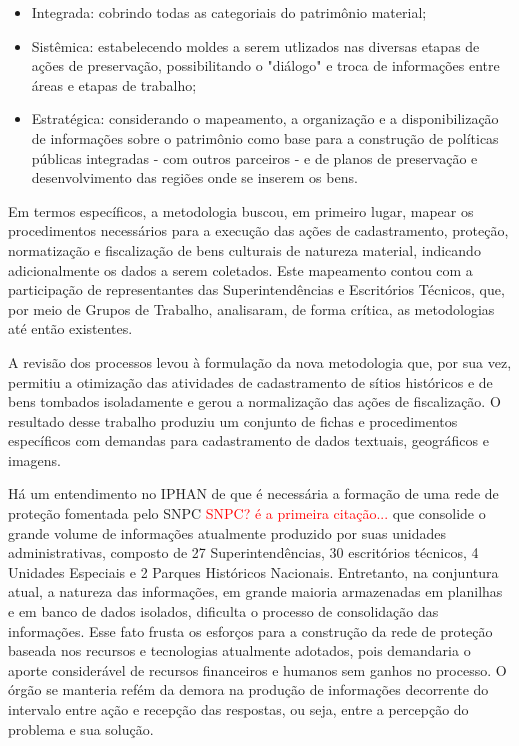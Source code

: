 \begin{itemize}
\item Integrada: cobrindo todas as categoriais do patrimônio material;
\item Sistêmica: estabelecendo moldes a serem utlizados nas diversas etapas de ações de preservação, possibilitando o "diálogo" e troca de informações entre áreas e etapas de trabalho;
\item Estratégica: considerando o mapeamento, a organização e a disponibilização de informações sobre o patrimônio como base para a construção de políticas públicas integradas - com outros parceiros - e de planos de preservação e desenvolvimento das regiões onde se inserem os bens.
\end{itemize}

Em termos específicos, a metodologia buscou, em primeiro lugar, mapear os procedimentos necessários para a execução das ações de cadastramento, proteção, normatização e fiscalização de bens culturais de natureza material, indicando adicionalmente os dados a serem coletados. Este mapeamento contou com a participação de representantes das Superintendências e Escritórios Técnicos, que, por meio de Grupos de Trabalho, analisaram, de forma crítica, as metodologias até então existentes.

A revisão dos processos levou à formulação da nova metodologia que, por sua vez, permitiu a otimização das atividades de cadastramento de sítios históricos e de bens tombados isoladamente e gerou a normalização das ações de fiscalização. O resultado desse trabalho produziu um conjunto de fichas e procedimentos específicos com demandas para cadastramento de dados textuais, geográficos e imagens.

Há um entendimento no IPHAN de que é necessária a formação de uma rede de proteção fomentada pelo SNPC \textcolor{red}{SNPC? é a primeira citação...} que consolide o grande volume de informações atualmente produzido por suas unidades administrativas, composto de 27 Superintendências, 30 escritórios técnicos, 4 Unidades Especiais e 2 Parques Históricos Nacionais. Entretanto, na conjuntura atual, a natureza das informações, em grande maioria armazenadas em planilhas e em banco de dados isolados, dificulta o processo de consolidação das informações. Esse fato frusta os esforços para a construção da rede de proteção baseada nos recursos e tecnologias atualmente adotados, pois demandaria o aporte considerável de recursos financeiros e humanos sem ganhos no processo. O órgão se manteria refém da demora na produção de informações decorrente do intervalo entre ação e recepção das respostas, ou seja, entre a percepção do problema e sua solução.

